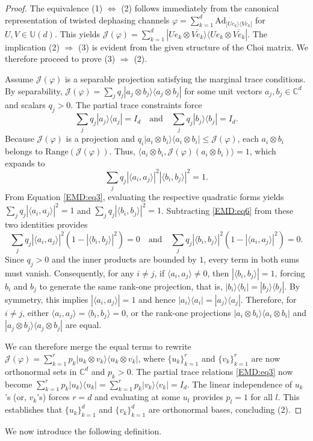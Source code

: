 \documentclass[11pt,reqno]{amsart}
\theoremstyle{definition}
\theoremstyle{plain}
\theoremstyle{remark}
\newcommand{\la}{\langle}
\newcommand{\ra}{\rangle}
\numberwithin{equation}{section}%
\begin{document}
\begin{proof}
    The equivalence (1) $\Leftrightarrow$ (2) follows immediately from the canonical representation of twisted dephasing channels $\varphi = \sum_{k=1}^d \text{Ad}_{|Ue_k\ra\la Ve_k|}$ for $U,V\in\mathbb{U}(d)$. This yields $\mathcal{J}(\varphi) = \sum_{k=1}^d |Ue_k \otimes \overline{Ve_k}\ra\la Ue_k \otimes \overline{Ve_k}|$. The implication (2) $\Rightarrow$ (3) is evident from the given structure of the Choi matrix. We therefore proceed to prove (3) $\Rightarrow$ (2).
    
    Assume $\mathcal{J}(\varphi)$ is a separable projection satisfying the marginal trace conditions. By separability, $\mathcal{J}(\varphi) = \sum_j q_j |a_j \otimes b_j\ra\la a_j \otimes b_j|$ for some unit vectors $a_j, b_j \in \mathbb{C}^d$ and scalars $q_j > 0$. The partial trace constraints force
    \begin{equation}\label{EMD:eq3}
        \sum_j q_j |a_j\ra\la a_j| = I_d \quad \text{and} \quad \sum_j q_j |b_j\ra\la b_j| = I_d.
    \end{equation}
    Because $\mathcal{J}(\varphi)$ is a projection and $q_i |a_i \otimes b_i\ra\la a_i \otimes b_i| \le \mathcal{J}(\varphi)$, each $a_i \otimes b_i$ belongs to $\text{Range}(\mathcal{J}(\varphi))$. Thus, $\la a_i \otimes b_i, \mathcal{J}(\varphi)(a_i \otimes b_i)\ra = 1$, which expands to
    \begin{equation}\label{EMD:eq6}
        \sum_j q_j |\la a_i, a_j\ra|^2 |\la b_i, b_j\ra|^2 = 1.
    \end{equation}
    From Equation \ref{EMD:eq3}, evaluating the respective quadratic forms yields $\sum_j q_j |\la a_i, a_j\ra|^2 = 1$ and $\sum_j q_j |\la b_i, b_j\ra|^2 = 1$. Subtracting \eqref{EMD:eq6} from these two identities provides
    \[
        \sum_j q_j |\la a_i, a_j\ra|^2 (1 - |\la b_i, b_j\ra|^2) = 0 \quad \text{and} \quad \sum_j q_j |\la b_i, b_j\ra|^2 (1 - |\la a_i, a_j\ra|^2) = 0.
    \]
    Since $q_j > 0$ and the inner products are bounded by $1$, every term in both sums must vanish. Consequently, for any $i \neq j$, if $\la a_i, a_j\ra \neq 0$, then $|\la b_i, b_j\ra| = 1$, forcing $b_i$ and $b_j$ to generate the same rank-one projection, that is, $|b_i\ra\la b_i| = |b_j\ra\la b_j|$. By symmetry, this implies $|\la a_i, a_j\ra| = 1$ and hence $|a_i\ra\la a_i| = |a_j\ra\la a_j|$. Therefore, for $i \neq j$, either $\la a_i, a_j\ra = \la b_i, b_j\ra = 0$, or the rank-one projections $|a_i \otimes b_i\ra\la a_i \otimes b_i|$ and $|a_j \otimes b_j\ra\la a_j \otimes b_j|$ are equal.
    
    We can therefore merge the equal terms to rewrite $\mathcal{J}(\varphi) = \sum_{k=1}^r p_k |u_k \otimes v_k\ra\la u_k \otimes v_k|$, where $\{u_k\}_{k=1}^r$ and $\{v_k\}_{k=1}^r$ are now orthonormal sets in $\mathbb{C}^d$ and $p_k > 0$. The partial trace relations \eqref{EMD:eq3} now become $\sum_{k=1}^r p_k |u_k\ra\la u_k| = \sum_{k=1}^r p_k |v_k\ra\la v_k| = I_d$. The linear independence of $u_k$'s (or, $v_k$'s) forces $r = d$ and evaluating at some $u_l$ provides $p_l = 1$ for all $l$. This establishes that $\{u_k\}_{k=1}^d$ and $\{v_k\}_{k=1}^d$ are orthonormal bases, concluding (2).
\end{proof}
We now introduce the following definition.
 
\end{document}
